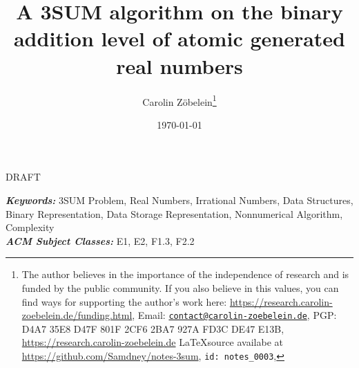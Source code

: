 \documentclass{article}
\newtheorem*{theorem A}{Theorem A}
\newtheorem*{theorem B}{N\"olker's Theorem}
\theoremstyle{remark}
\theoremstyle{remark}
\begin{document}
\title{A 3SUM algorithm on the binary addition level of atomic generated real numbers}
\author{Carolin Z\"obelein\thanks{The author believes in the importance of the independence of research and is funded by the public community. If you also believe in this values, you can find ways for supporting the author's work here: \url{https://research.carolin-zoebelein.de/funding.html}, Email: \href{mailto:contact@carolin-zoebelein.de}{\texttt{contact@carolin-zoebelein.de}}, PGP: D4A7 35E8 D47F 801F 2CF6 2BA7 927A FD3C DE47 E13B, \url{https://research.carolin-zoebelein.de} \LaTeX source availabe at \url{https://github.com/Samdney/notes-3sum}, \texttt{id: notes\_0003}, \Cooley}}
\date{\today}
\maketitle
\begin{center}
    DRAFT
\end{center}
\begin{abstract}
    \blindtext[1]
\end{abstract}
\providecommand{\keywords}[1]{\small{\textbf{\textit{Keywords:}} #1}}
\providecommand{\Classification}[1]{\small{\textbf{\textit{ACM Subject Classes:}} #1}}

\begin{flushleft}
    \keywords{3SUM Problem, Real Numbers, Irrational Numbers, Data Structures, Binary Representation, Data Storage Representation, Nonnumerical Algorithm, Complexity}\\
    \Classification{E1, E2, F1.3, F2.2}
\end{flushleft}
\tableofcontents
\end{document}
